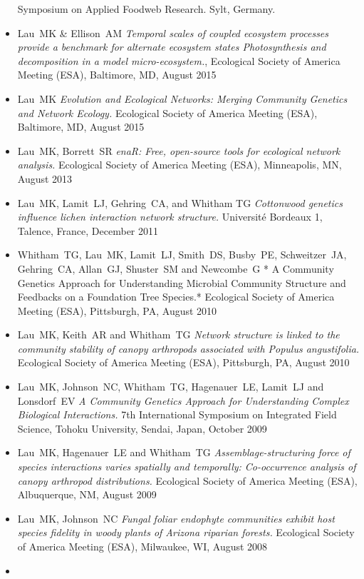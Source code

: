 \documentclass[a4paper]{article}
\begin{document}
\begin{itemize}
  Symposium on Applied Foodweb Research. Sylt, Germany. 
\item Lau~MK \& Ellison~AM \emph{Temporal scales of coupled ecosystem
  processes provide a benchmark for alternate ecosystem states
  Photosynthesis and decomposition in a model micro-ecosystem.},
  Ecological Society of America Meeting (ESA), Baltimore, MD, August
  2015
\item Lau~MK \emph{Evolution and Ecological Networks: Merging
  Community Genetics and Network Ecology.} Ecological Society of
  America Meeting (ESA), Baltimore, MD, August 2015
\item
  Lau~MK, Borrett~SR \emph{enaR: Free, open-source tools for ecological
  network analysis.} Ecological Society of America Meeting (ESA),
  Minneapolis, MN, August 2013
\item
  Lau~MK, Lamit~LJ, Gehring~CA, and Whitham TG \emph{Cottonwood genetics
  influence lichen interaction network structure.} Université Bordeaux
  1, Talence, France, December 2011
\item
  Whitham~TG, Lau~MK, Lamit~LJ, Smith~DS, Busby~PE, Schweitzer~JA,
  Gehring~CA, Allan~GJ, Shuster~SM and Newcombe~G * A Community Genetics
  Approach for Understanding Microbial Community Structure and Feedbacks
  on a Foundation Tree Species.* Ecological Society of America Meeting
  (ESA), Pittsburgh, PA, August 2010
\item
  Lau~MK, Keith~AR and Whitham~TG \emph{Network structure is linked to
  the community stability of canopy arthropods associated with Populus
  angustifolia.} Ecological Society of America Meeting (ESA),
  Pittsburgh, PA, August 2010
\item
  Lau~MK, Johnson~NC, Whitham~TG, Hagenauer~LE, Lamit~LJ and Lonsdorf~EV
  \emph{A Community Genetics Approach for Understanding Complex
  Biological Interactions.} 7th International Symposium on Integrated
  Field Science, Tohoku University, Sendai, Japan, October 2009
\item
  Lau~MK, Hagenauer~LE and Whitham~TG \emph{Assemblage-structuring force
  of species interactions varies spatially and temporally: Co-occurrence
  analysis of canopy arthropod distributions.} Ecological Society of
  America Meeting (ESA), Albuquerque, NM, August 2009
\item
  Lau~MK, Johnson~NC \emph{Fungal foliar endophyte communities exhibit
  host species fidelity in woody plants of Arizona riparian forests.}
  Ecological Society of America Meeting (ESA), Milwaukee, WI, August
  2008
\item

\end{itemize}
\end{document}
